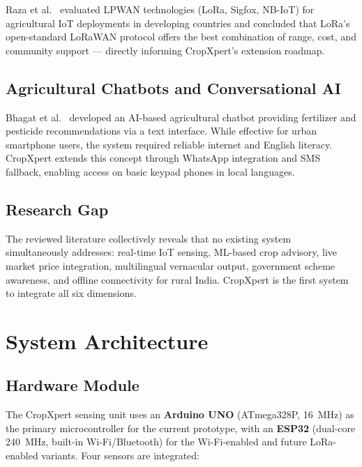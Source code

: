 \documentclass[10pt,twocolumn]{article}
\begin{document}
Raza et al.\ \cite{raza2017} evaluated LPWAN technologies (LoRa, Sigfox, NB-IoT) for agricultural IoT deployments in developing countries and concluded that LoRa's open-standard LoRaWAN protocol offers the best combination of range, cost, and community support --- directly informing CropXpert's extension roadmap.

\subsection{Agricultural Chatbots and Conversational AI}

Bhagat et al.\ \cite{bhagat2019} developed an AI-based agricultural chatbot providing fertilizer and pesticide recommendations via a text interface. While effective for urban smartphone users, the system required reliable internet and English literacy. CropXpert extends this concept through WhatsApp integration and SMS fallback, enabling access on basic keypad phones in local languages.

\subsection{Research Gap}

The reviewed literature collectively reveals that no existing system simultaneously addresses: real-time IoT sensing, ML-based crop advisory, live market price integration, multilingual vernacular output, government scheme awareness, and offline connectivity for rural India. CropXpert is the first system to integrate all six dimensions.

\section{System Architecture}

\subsection{Hardware Module}

The CropXpert sensing unit uses an \textbf{Arduino UNO} (ATmega328P, 16~MHz) as the primary microcontroller for the current prototype, with an \textbf{ESP32} (dual-core 240~MHz, built-in Wi-Fi/Bluetooth) for the Wi-Fi-enabled and future LoRa-enabled variants. Four sensors are integrated:
\end{document}

